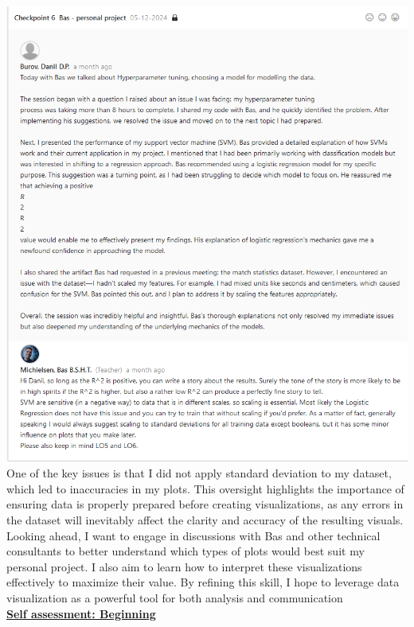 \documentclass{article}
\begin{document}
\includegraphics[width=\textwidth,keepaspectratio]{images/Feedback_Bas_2.png}\\

One of the key issues is that I did not apply standard deviation to my dataset, which led to inaccuracies in my plots. This oversight highlights the importance of ensuring data is properly prepared before creating visualizations, as any errors in the dataset will inevitably affect the clarity and accuracy of the resulting visuals.\\

Looking ahead, I want to engage in discussions with Bas and other technical consultants to better understand which types of plots would best suit my personal project. I also aim to learn how to interpret these visualizations effectively to maximize their value. By refining this skill, I hope to leverage data visualization as a powerful tool for both analysis and communication\\
  \underline{\textbf{Self assessment: Beginning}}
\end{document}
